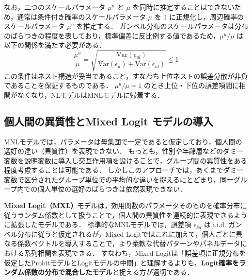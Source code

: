 なお，二つのスケールパラメータ $\mu^u$ と $\mu$ を同時に推定することはできないため，通常は条件付き確率のスケールパラメータ $\mu$ を 1 に正規化し，周辺確率のスケールパラメータ $\mu^u$ を推定する．
ガンベル分布のスケールパラメータは分布のばらつきの程度を表しており，標準偏差に反比例する値であるため，$\mu^u / \mu$ は以下の関係を満たす必要がある．
\begin{equation}
  \frac{\mu^u}{\mu} = \sqrt{\frac{\mathrm{Var}(\epsilon_{ul})}{\mathrm{Var}(\epsilon_u) + \mathrm{Var}(\epsilon_{ul})}} \leq 1
\end{equation}
この条件はネスト構造が妥当であること，すなわち上位ネストの誤差分散が非負であることを保証するものである．
$\mu^u / \mu = 1$ のとき上位・下位の誤差項間に相関がなくなり，NLモデルはMNLモデルに帰着する．

\subsection{個人間の異質性とMixed Logit モデルの導入}\label{ssec:mixed_logit}
MNLモデルでは，パラメータは母集団で一定であると仮定しており，個人間の選好の違い（異質性）を表現できない．
もっとも，性別や年齢層などのダミー変数を説明変数に導入し交互作用項を設けることで，グループ間の異質性をある程度考慮することは可能である．
しかしこのアプローチでは，あくまでダミー変数で区分されたグループ単位での平均的な違いを捉えるにとどまり，同一グループ内での個人単位の選好のばらつきは依然表現できない．

\textbf{Mixed Logit（MXL）}モデルは，効用関数のパラメータそのものを確率分布に従うランダム係数として扱うことで，個人間の異質性を連続的に表現できるように拡張したモデルである．
標準的なMNLモデルでは，誤差項 $\epsilon_{ka}$ は i.i.d. ガンベル分布に従うと仮定されるが，Mixed Logitではこれに加えて，個人ごとに異なる係数ベクトルを導入することで，より柔軟な代替パターンやパネルデータにおける系列相関を表現できる．
すなわち，Mixed Logitは「誤差項に正規分布を仮定したProbitモデルとLogitモデルの中間」と理解するよりも，\textbf{Logit確率をランダム係数の分布で混合したモデル}と捉える方が適切である．


